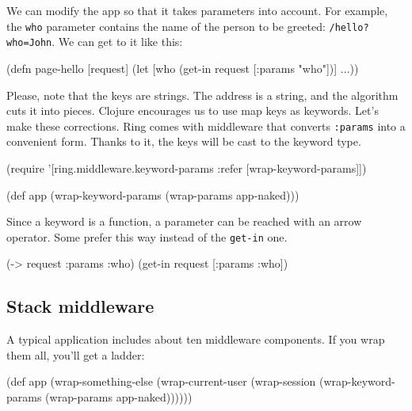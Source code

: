We can modify the app so that it takes parameters into account. For example, the \verb|who| parameter contains the name of the person to be greeted:
\verb|/hello?who=John|. We can get to it like this:

\begin{english}
\begin{clojure}
(defn page-hello [request]
(let [who (get-in request [:params "who"])]
...))
\end{clojure}
\end{english}


Please, note that the keys are strings. The address is a string, and the algorithm cuts it into pieces. Clojure encourages us to use map keys as keywords. Let's make these corrections. Ring comes with middleware that converts \verb|:params| into a convenient form. Thanks to it, the keys will be cast to the keyword type.


\begin{english}
\begin{clojure}
(require '[ring.middleware.keyword-params
:refer [wrap-keyword-params]])

(def app (wrap-keyword-params
(wrap-params app-naked)))
\end{clojure}
\end{english}


Since a keyword is a function, a parameter can be reached with an arrow operator. Some prefer this way instead of the \verb|get-in| one.

\begin{english}
\begin{clojure}
(-> request :params :who)
(get-in request [:params :who])
\end{clojure}
\end{english}

\subsection{Stack middleware}

A typical application includes about ten middleware components. If you wrap them all, you'll get a ladder:

\begin{english}
\begin{clojure}
(def app
(wrap-something-else
(wrap-current-user
(wrap-session
(wrap-keyword-params
(wrap-params app-naked))))))
\end{clojure}
\end{english}

